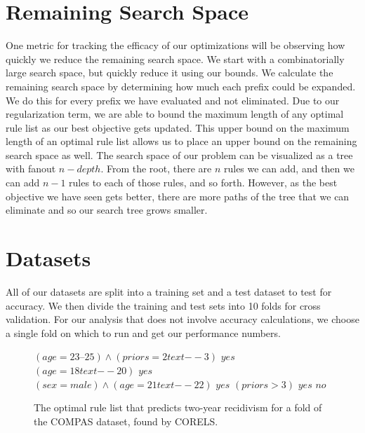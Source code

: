 \section{Remaining Search Space}
One metric for tracking the efficacy of our optimizations will be observing how quickly we reduce the remaining search space.
We start with a combinatorially large search space, but quickly reduce it using our bounds.
We calculate the remaining search space by determining how much each prefix could be expanded.
We do this for every prefix we have evaluated and not eliminated.
Due to our regularization term, we are able to bound the maximum length of any optimal rule list as our best objective gets updated.
This upper bound on the maximum length of an optimal rule list allows us to place an upper bound on the remaining search space as well.
The search space of our problem can be visualized as a tree with fanout $n - depth$.
From the root, there are $n$ rules we can add, and then we can add $n - 1$ rules to each of those rules, and so forth.
However, as the best objective we have seen gets better, there are more paths of the tree that we can eliminate and so our search tree grows smaller.

\section{Datasets}
\label{def:datasets}
All of our datasets are split into a training set and a test dataset to test for accuracy.
We then divide the training and test sets into 10 folds for cross validation.
For our analysis that does not involve accuracy calculations, we choose a single fold on which to run and get our performance numbers.

\begin{figure}[t!]
\begin{algorithmic}
\normalsize
\State \bif $(age=23\text{--}25) \wedge (priors=2text{--}3)$ \bthen $yes$
\State \belif $(age=18text{--}20)$ \bthen $yes$
\State \belif $(sex=male) \wedge (age=21text{--}22)$ \bthen $yes$
\State \belif $(priors > 3)$ \bthen $yes$
\State \belse $no$
\end{algorithmic}
\caption{The optimal rule list that predicts two-year recidivism for a fold of the COMPAS dataset, found by CORELS.}
\label{fig:rule-list-compas}
\end{figure}

